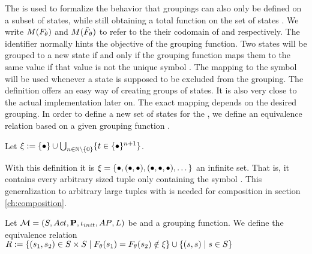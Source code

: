 \documentclass[preview]{standalone}
\begin{document}
The \grpfctsubN is used to formalize the behavior that groupings can also only be defined on a subset of states, while still obtaining a total function on the set of states \states. We write $M({F_{{\theta}}})$ and $M({\tilde{F}_{{\theta}}})$ to refer to the their codomain of \grpfct and \grpfctsub respectively. The identifier \viewppty normally hints the objective of the grouping function. Two states will be grouped to a new state if and only if the grouping function maps them to the same value if that value is not the unique symbol \remelem. The mapping to the symbol \remelem will be used whenever a state is supposed to be excluded from the grouping. The definition offers an easy way of creating groups of states. It is also very close to the actual implementation later on. The exact mapping depends on the desired grouping. In order to define a new set of states for the \viewN, we define an equivalence relation \eqrelview based on a given grouping function \grpfct.

\begin{definition}
	Let ${\xi} := \{{\bullet}\} \cup \bigcup_{n \in {\mathbb{N}} \setminus \{0\}} \{t \in \{{\bullet}\}^{n+1}\}$.
\end{definition}

With this definition it is ${\xi} = \{{\bullet}, ({\bullet}, {\bullet}), ({\bullet}, {\bullet}, {\bullet}), \dots\}$ an infinite set. That is, it contains every arbitrary sized tuple only containing the symbol \remelem. This generalization to arbitrary large tuples with \remelem is needed for composition in section \ref{ch:composition}.

\begin{definition}
	Let ${{{\mathcal{M}}}} = {{({S}, {Act}, {\textbf{P}}, {\iota_{init}}, {AP}, {L})}}$ be \achgphN and \grpfct a grouping function. We define the equivalence relation ${R} :=\{ ({s}_1, {s}_2) \in {S} \times {S} \mid {F_{\ensuremath{{\theta}}}}({s}_1) = {F_{{\theta}}}({s}_2) \notin {\xi}\} \cup \{({s}, {s})  \mid {s} \in {S}\}$
	
	\label{def:eqrelview}
\end{definition}
\end{document}
